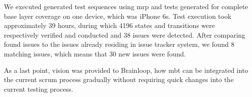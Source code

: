 \par
We executed generated test sequences using \acrshort{mrp} and tests generated for complete base layer coverage on one device, which was iPhone 6s. Test execution took approximately 39 hours, during which 4196 states and transitions were respectively verified and conducted and 38 issues were detected. After comparing found issues to the issues already residing in issue tracker system, we found 8 matching issues, which means that 30 new issues were found.  
\par
As a last point, vision was provided to Brainloop, how \acrshort{mbt} can be integrated into the current scrum process gradually without requiring quick changes into the current testing process.
 








 


